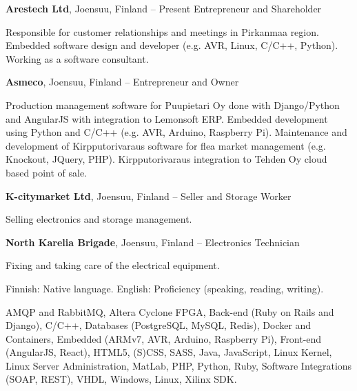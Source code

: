 \documentclass[letterpaper,MMMyyyy,nonstopmode]{simpleresumecv}
\begin{document}
\begin{Body}
\BigGap
\Entry
\textbf{Arestech Ltd}, Joensuu, Finland
\hfill
{} -- Present
\Gap
\BulletItem Entrepreneur and Shareholder
\begin{Detail}
    \SubBulletItem Responsible for customer relationships and meetings in
    Pirkanmaa region.
    \SubBulletItem Embedded software design and developer (e.g. AVR, Linux,
    C/C++, Python).
    \SubBulletItem Working as a software consultant.
\end{Detail}

\BigGap
\Entry
\textbf{Asmeco}, Joensuu, Finland
\hfill
{} -- 
\Gap
\BulletItem Entrepreneur and Owner
\begin{Detail}
    \SubBulletItem Production management software for Puupietari Oy done with
    Django/Python and \newline AngularJS with integration to Lemonsoft ERP.
    \SubBulletItem Embedded development using Python and C/C++ (e.g. AVR,
    Arduino, Raspberry Pi).
    \SubBulletItem Maintenance and development of Kirpputorivaraus software for
    flea market \newline management (e.g. Knockout, JQuery, PHP).
    \SubBulletItem Kirpputorivaraus integration to Tehden Oy cloud based point
    of sale.
\end{Detail}

\BigGap
\Entry
\textbf{K-citymarket Ltd}, Joensuu, Finland
\hfill
{} -- 
\Gap
\BulletItem Seller and Storage Worker
\begin{Detail}
    \SubBulletItem Selling electronics and storage management.
\end{Detail}

\BigGap
\Entry
\textbf{North Karelia Brigade}, Joensuu, Finland
\hfill
{} -- 
\Gap
\BulletItem Electronics Technician
\begin{Detail}
    \SubBulletItem Fixing and taking care of the electrical equipment.
\end{Detail}

\newpage



\BulletItem Finnish: Native language.
\Gap
\BulletItem English: Proficiency (speaking, reading, writing).



\Entry
\BulletItem AMQP and RabbitMQ,
\BulletItem Altera Cyclone FPGA,
\BulletItem Back-end (Ruby on Rails and Django),
\BulletItem C/C++,
\BulletItem Databases (PostgreSQL, MySQL, Redis),
\BulletItem Docker and Containers,
\BulletItem Embedded (ARMv7, AVR, Arduino, Raspberry Pi),
\BulletItem Front-end (AngularJS, React),
\BulletItem HTML5, (S)CSS, SASS,
\BulletItem Java,
\BulletItem JavaScript,
\BulletItem Linux Kernel,
\BulletItem Linux Server Administration,
\BulletItem MatLab,
\BulletItem PHP,
\BulletItem Python,
\BulletItem Ruby,
\BulletItem Software Integrations (SOAP, REST),
\BulletItem VHDL,
\BulletItem Windows, Linux,
\BulletItem Xilinx SDK.


\end{Body}
\end{document}

